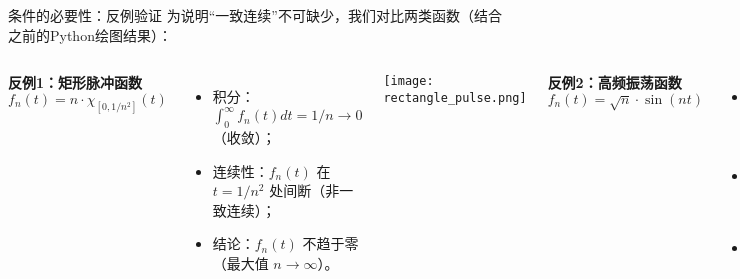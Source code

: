\begin{frame}{条件的必要性：反例验证}
  为说明“一致连续”不可缺少，我们对比两类函数（结合之前的Python绘图结果）：

  \begin{columns}[T] %
    \textbf{反例1：矩形脉冲函数}
    \[ f_n(t) = n \cdot \chi_{[0, 1/n^2]}(t) \]
    \begin{itemize}
      \item 积分：$\int_0^\infty f_n(t)dt = 1/n \to 0$（收敛）；
      \item 连续性：$f_n(t)$ 在 $t=1/n^2$ 处间断（非一致连续）；
      \item 结论：$f_n(t)$ 不趋于零（最大值 $n \to \infty$）。
    \end{itemize}
    \vspace{0.3cm}
    \texttt{[image: rectangle\_pulse.png]} %

    \textbf{反例2：高频振荡函数}
    \[ f_n(t) = \sqrt{n} \cdot \sin(nt) \]
    \begin{itemize}
      \item 积分：$\int_0^\infty f_n(t)dt = \frac{1 - \cos(nt)}{\sqrt{n}} \to 0$（收敛）；
      \item 连续性：$f_n(t)$ 连续，但 $f_n'(t) = n^{3/2}\cos(nt)$ 无界（非一致连续）；
      \item 结论：$f_n(t)$ 振幅 $\sqrt{n} \to \infty$（不趋于零）。
    \end{itemize}
    \vspace{0.3cm}
    \texttt{[image: oscillating\_function.png]} %
  \end{columns}
\end{frame}

